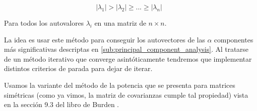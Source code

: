 $$ |\lambda_1| > |\lambda_2| \geq ... \geq |\lambda_n| $$

Para todos los autovalores $\lambda_i$ en una matriz de $n\times n$.

La idea es usar este método para conseguir los autovectores de las $\alpha$
componentes más significativas descriptas en \ref{sub:principal_component_analysis}. Al tratarse
de un método iterativo que converge asintóticamente tendremos que implementar distintos criterios de parada para dejar de iterar.

Usamos la variante del método de la potencia que se presenta para matrices simétricas (como ya vimos, la matriz de covarianzas cumple tal propiedad) vista en la sección 9.3 del libro de Burden \cite{Burden}.
